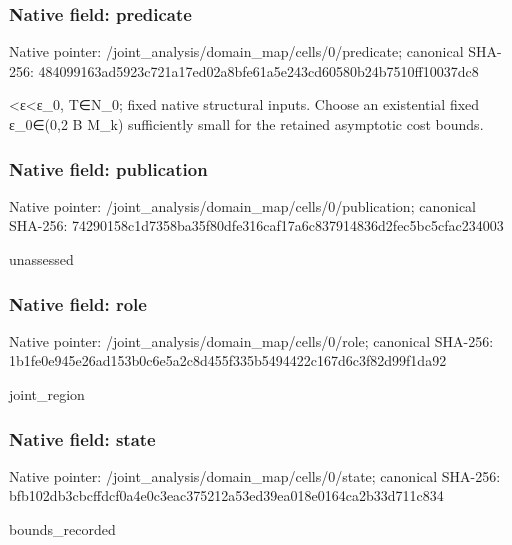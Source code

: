 \documentclass[10pt,a4paper]{article}
\begin{document}
\subsubsection{Native field: predicate}
Native pointer: /joint\_\allowbreak{}analysis/domain\_\allowbreak{}map/cells/0/predicate; canonical SHA-256: 484099163ad5923c721a17ed02a8bfe61a5e243cd60580b24b7510ff10037dc8

\begingroup\raggedright{}<{\AtlasUnicodeText ε}\allowbreak{}<{\AtlasUnicodeText ε}\allowbreak{}\_\allowbreak{}0,\allowbreak{} T{\AtlasUnicodeSymbols ∈}\allowbreak{}N\_\allowbreak{}0;\allowbreak{} fixed native structural inputs. Choose an existential fixed {\AtlasUnicodeText ε}\allowbreak{}\_\allowbreak{}0{\AtlasUnicodeSymbols ∈}\allowbreak{}(0,\allowbreak{}2 B M\_\allowbreak{}k) sufficiently small for the retained asymptotic cost bounds.\par\endgroup

\subsubsection{Native field: publication}
Native pointer: /joint\_\allowbreak{}analysis/domain\_\allowbreak{}map/cells/0/publication; canonical SHA-256: 74290158c1d7358ba35f80dfe316caf17a6c837914836d2fec5bc5cfac234003

\begingroup\raggedright\sloppy unassessed\par\endgroup

\subsubsection{Native field: role}
Native pointer: /joint\_\allowbreak{}analysis/domain\_\allowbreak{}map/cells/0/role; canonical SHA-256: 1b1fe0e945e26ad153b0c6e5a2c8d455f335b5494422c167d6c3f82d99f1da92

\begingroup\raggedright\sloppy joint\_\allowbreak{}region\par\endgroup

\subsubsection{Native field: state}
Native pointer: /joint\_\allowbreak{}analysis/domain\_\allowbreak{}map/cells/0/state; canonical SHA-256: bfb102db3cbcffdcf0a4e0c3eac375212a53ed39ea018e0164ca2b33d711c834

\begingroup\raggedright\sloppy bounds\_\allowbreak{}recorded\par\endgroup
\end{document}
